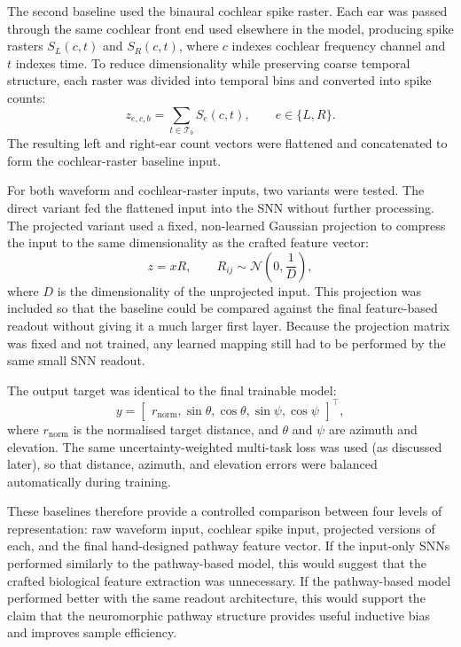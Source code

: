 The second baseline used the binaural cochlear spike raster. Each ear was passed through the same cochlear front end used elsewhere in the model, producing spike rasters $S_L(c,t)$ and $S_R(c,t)$, where $c$ indexes cochlear frequency channel and $t$ indexes time. To reduce dimensionality while preserving coarse temporal structure, each raster was divided into temporal bins and converted into spike counts:
\begin{equation}
    z_{e,c,b}
    =
    \sum_{t \in \mathcal{T}_b}
    S_e(c,t),
    \qquad
    e \in \{L,R\}.
\end{equation}
The resulting left and right-ear count vectors were flattened and concatenated to form the cochlear-raster baseline input.

For both waveform and cochlear-raster inputs, two variants were tested. The direct variant fed the flattened input into the SNN without further processing. The projected variant used a fixed, non-learned Gaussian projection to compress the input to the same dimensionality as the crafted feature vector:
\begin{equation}
    z = xR,
    \qquad
    R_{ij}
    \sim
    \mathcal{N}
    \left(
        0,
        \frac{1}{D}
    \right),
\end{equation}
where $D$ is the dimensionality of the unprojected input. This projection was included so that the baseline could be compared against the final feature-based readout without giving it a much larger first layer. Because the projection matrix was fixed and not trained, any learned mapping still had to be performed by the same small SNN readout.

The output target was identical to the final trainable model:
\begin{equation}
    y
    =
    \begin{bmatrix}
        r_{\mathrm{norm}},
        \sin \theta,
        \cos \theta,
        \sin \psi,
        \cos \psi
    \end{bmatrix}^{\top},
\end{equation}
where $r_{\mathrm{norm}}$ is the normalised target distance, and $\theta$ and $\psi$ are azimuth and elevation. The same uncertainty-weighted multi-task loss was used (as discussed later), so that distance, azimuth, and elevation errors were balanced automatically during training.

These baselines therefore provide a controlled comparison between four levels of representation: raw waveform input, cochlear spike input, projected versions of each, and the final hand-designed pathway feature vector. If the input-only SNNs performed similarly to the pathway-based model, this would suggest that the crafted biological feature extraction was unnecessary. If the pathway-based model performed better with the same readout architecture, this would support the claim that the neuromorphic pathway structure provides useful inductive bias and improves sample efficiency.

